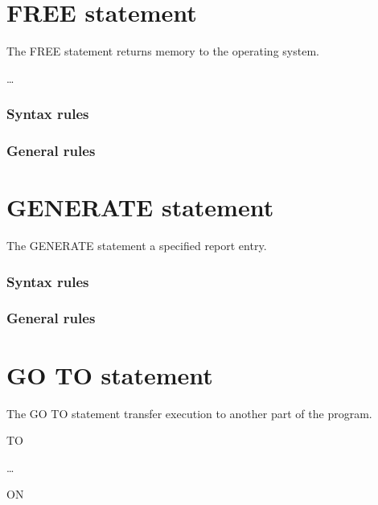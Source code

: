 \section{FREE statement}

The FREE statement returns memory to the operating system.

\begin{syntax}
  \begin{1=}
    \identifier
  \end{1=} \ldots
\end{syntax}

\subsubsection{Syntax rules}

\subsubsection{General rules}

\section{GENERATE statement}

The GENERATE statement a specified report entry.

\begin{syntax}
   \reportname
\end{syntax}

\subsubsection{Syntax rules}

\subsubsection{General rules}

\section{GO TO statement}

The GO TO statement transfer execution to another part of the program.

\begin{syntax}
   TO
  \begin{1=}
    \procedurename \ldots \\
  \end{1=}
  \begin{0-1}
     ON \identifier
  \end{0-1}
\end{syntax}

